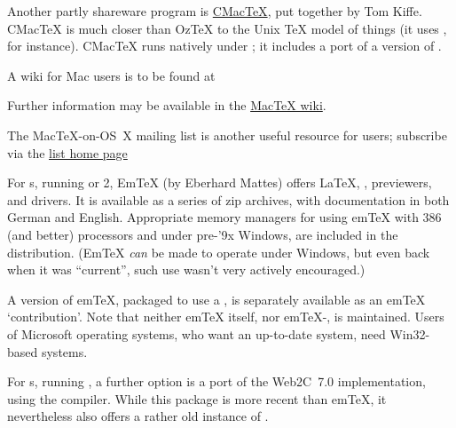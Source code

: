 Another partly shareware program is
\href{http://www.kiffe.com/cmactex.html}{CMac\TeX{}}, put together by
Tom Kiffe.  CMac\TeX{} is much closer than Oz\TeX{} to the Unix \TeX{}
model of things (it uses , for instance).  CMac\TeX{}
runs natively under \macosx{}; it includes a port of a version of
.

\begin{flatversion}
  A wiki for Mac users is to be found at
\end{flatversion}
\begin{hyperversion}
  Further information may be available in the %
  \href{http://mactex-wiki.tug.org/}{MacTeX wiki}.
\end{hyperversion}
The Mac\TeX{}-on-OS~X mailing list is another useful resource for
users; subscribe via the
\href{http://mactex-wiki.tug.org/wiki/index.php?title=TeX_on_Mac_OS_X_mailing_list}{list home page}
\begin{ctanrefs}
\item[cmactex]
\item[mactex]
\item[oztex]
\end{ctanrefs}


For s, running \MSDOS{} or 2, Em\TeX{} (by Eberhard
Mattes) offers \LaTeX{}, \BibTeX{}, previewers, and drivers.  It is
available as a series of zip archives, with documentation in both
German and English.  Appropriate memory managers for using em\TeX{}
with 386 (and better) processors and under pre-'9x Windows, are
included in the distribution.  (Em\TeX{} \emph{can} be made to operate
under Windows, but even back when it was ``current'', such use wasn't
very actively encouraged.)

A version of em\TeX{}, packaged to use a %
, is separately available as an
em\TeX{} `contribution'.  Note that neither em\TeX{} itself, nor
em\TeX{}-, is maintained.  Users of Microsoft operating
systems, who want an up-to-date \AllTeX{} system, need Win32-based
systems.

For s, running \MSDOS{}, a further option is a port of the
Web2C~7.0 implementation, using the  
compiler.  While this package is more recent than em\TeX{}, it
nevertheless also offers a rather old instance of \AllTeX{}.

